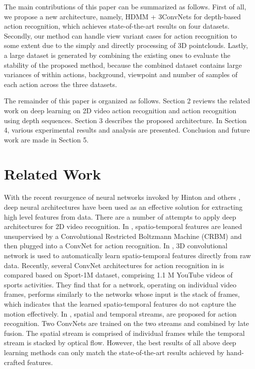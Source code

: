 \documentclass[conference]{IEEEtran}
\begin{document}
The main contributions of this paper can be summarized as follows. First of all, we propose a new architecture, namely, HDMM + 3ConvNets for depth-based action recognition, which achieves state-of-the-art results on four datasets. Secondly, our method can handle view variant cases for action recognition to some extent due to the simply and directly processing of 3D pointclouds. Lastly, a large dataset is generated by combining the existing ones to evaluate the stability of the proposed method, because the combined dataset contains large variances of within actions, background, viewpoint and number of samples of each action across the three datasets.

The remainder of this paper is organized as follows. Section 2 reviews the related work on deep learning on 2D video action recognition and action recognition using depth sequences. Section 3 describes the proposed architecture. In Section 4, various experimental results and analysis are presented. Conclusion and future work are made in Section 5.

\section{Related Work}
With the recent resurgence of neural networks invoked by Hinton and others \cite{hinton2006fast}, deep neural architectures have been used as an effective solution for extracting high level features from data. There are a number of attempts to apply deep architectures for 2D video recognition. In \cite{taylor2010convolutional}, spatio-temporal features are leaned unsupervised by a Convolutional Restricted Boltzmann Machine (CRBM) and then plugged into a ConvNet for action recognition. In \cite{ji20133d}, 3D convolutional network is used to automatically learn spatio-temporal features directly from raw data. Recently, several ConvNet architectures for action recognition in \cite{karpathy2014large} is compared based on Sport-1M dataset, comprising 1.1 M YouTube videos of sports activities. They find that for a network, operating on individual video frames, performs similarly to the networks whose input is the stack of frames, which indicates that the learned spatio-temporal features do not capture the motion effectively. In \cite{simonyan2014two}, spatial and temporal streams, are proposed for action recognition. Two ConvNets are trained on the two streams and combined by late fusion. The spatial stream is comprised of individual frames while the temporal stream is stacked by optical flow. However, the best results of all above deep learning methods can only match the state-of-the-art results achieved by hand-crafted features.
\end{document}
